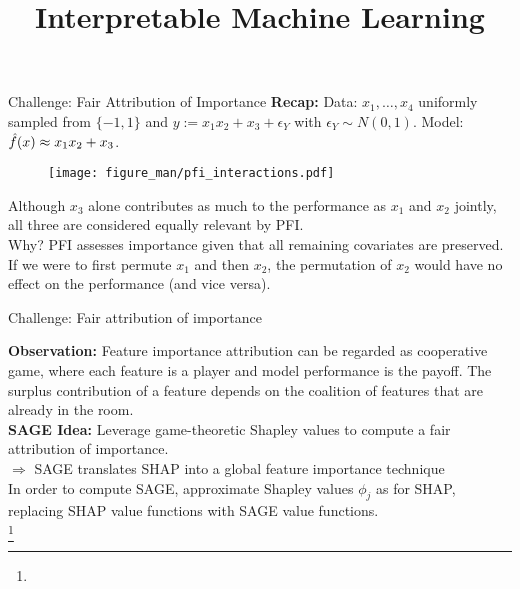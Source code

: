 \documentclass[11pt,compress,t,notes=noshow, aspectratio=169, xcolor=table]{beamer}
\title{Interpretable Machine Learning}
\date{}
\begin{document}
	\newcommand{\titlefigure}{figure_man/feature-importance.png}
    \newcommand{\learninggoals}{
    	\item Underdstand how PFI is computed
    	\item Understanding strengths and weaknesses
    	\item Testing Importance}
	
	
	

	

\begin{vbframe}{Challenge: Fair Attribution of Importance}
\textbf{Recap:} Data: $x_1, \dots, x_4$ uniformly sampled from $\{-1, 1\}$ and $y:= x_1 x_2 + x_3 + \epsilon_Y$ with $\epsilon_Y \sim N(0, 1)$. Model: $\hat{f}(x) \approx x_1 x_2 + x_3$.\\

\begin{figure}
\centering
  \texttt{[image: figure\_man/pfi\_interactions.pdf]}
\end{figure}

Although $x_3$ alone contributes as much to the performance as $x_1$ and $x_2$ jointly, all three are considered equally relevant by PFI.\\
\lz
Why? PFI assesses importance given that all remaining covariates are preserved. If we were to first permute $x_1$ and then $x_2$, the permutation of $x_2$ would have no effect on the performance (and vice versa).
\end{vbframe}


\begin{vbframe}{Challenge: Fair attribution of importance}

\textbf{Observation:} Feature importance attribution can be regarded as cooperative game, where each feature is a player and model performance is the payoff. The surplus contribution of a feature depends on the coalition of features that are already in the room.\\
\lz
\textbf{SAGE Idea:} Leverage game-theoretic Shapley values to compute a fair attribution of importance.\\
\lz
$\Rightarrow$ SAGE translates SHAP into a global feature importance technique\\
\lz
In order to compute SAGE, approximate Shapley values $\phi_j$ as for SHAP, replacing SHAP value functions with SAGE value functions.\\

\footnote[frame]{}
  
\end{vbframe}
\end{document}
